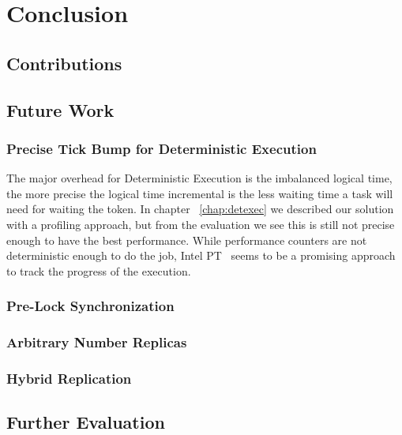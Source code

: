 \chapter{Conclusion}
\section{Contributions}
\section{Future Work}
\subsection{Precise Tick Bump for Deterministic Execution}
The major overhead for Deterministic Execution is the imbalanced logical time, the more precise the logical time incremental is the less waiting time a task will need for waiting the token. In chapter ~\ref{chap:detexec} we described our solution with a profiling approach, but from the evaluation we see this is still not precise enough to have the best performance. While performance counters are not deterministic enough to do the job, Intel PT~\cite{intelpt} seems to be a promising approach to track the progress of the execution. 
\subsection{Pre-Lock Synchronization}
\subsection{Arbitrary Number Replicas}
\subsection{Hybrid Replication}
\section{Further Evaluation}
